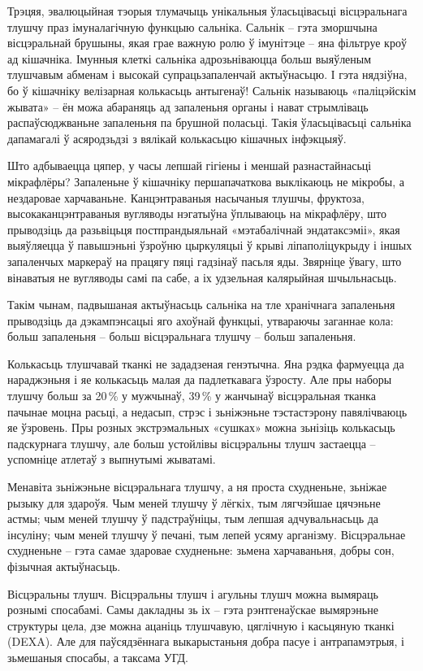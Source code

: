 Трэцяя, эвалюцыйная тэорыя тлумачыць унікальныя ўласьцівасьці вісцэральнага тлушчу праз імуналагічную функцыю сальніка. Сальнік – гэта зморшчына вісцэральнай брушыны, якая грае важную ролю ў імунітэце – яна фільтруе кроў ад кішачніка. Імунныя клеткі сальніка адрозьніваюцца больш выяўленым тлушчавым абменам і высокай супрацьзапаленчай актыўнасьцю. І гэта нядзіўна, бо ў кішачніку велізарная колькасьць антыгенаў! Сальнік называюць «паліцэйскім жывата» – ён можа абараняць ад запаленьня органы і нават стрымліваць распаўсюджваньне запаленьня па брушной поласьці. Такія ўласьцівасьці сальніка дапамагалі ў асяродзьдзі з вялікай колькасьцю кішачных інфэкцыяў.

Што адбываецца цяпер, у часы лепшай гігіены і меншай разнастайнасьці мікрафлёры? Запаленьне ў кішачніку першапачаткова выклікаюць не мікробы, а нездаровае харчаваньне. Канцэнтраваныя насычаныя тлушчы, фруктоза, высокаканцэнтраваныя вугляводы нэгатыўна ўплываюць на мікрафлёру, што прыводзіць да разьвіцьця постпрандыяльнай «мэтабалічнай эндатаксэміі», якая выяўляецца ў павышэньні ўзроўню цыркуляцыі ў крыві ліпаполіцукрыду і іншых запаленчых маркераў на працягу пяці гадзінаў пасьля яды. Звярніце ўвагу, што вінаватыя не вугляводы самі па сабе, а іх удзельная калярыйная шчыльнасьць.

Такім чынам, падвышаная актыўнасьць сальніка на тле хранічнага запаленьня прыводзіць да дэкампэнсацыі яго ахоўнай функцыі, утвараючы заганнае кола: больш запаленьня – больш вісцэральнага тлушчу – больш запаленьня.

Колькасьць тлушчавай тканкі не зададзеная генэтычна. Яна рэдка фармуецца да нараджэньня і яе колькасьць малая да падлеткавага ўзросту. Але пры наборы тлушчу больш за 20\,\% у мужчынаў, 39\,\% у жанчынаў вісцэральная тканка пачынае моцна расьці, а недасып, стрэс і зьніжэньне тэстастэрону павялічваюць яе ўзровень. Пры розных экстрэмальных «сушках» можна зьнізіць колькасьць падскурнага тлушчу, але больш устойлівы вісцэральны тлушч застаецца – успомніце атлетаў з выпнутымі жыватамі.

Менавіта зьніжэньне вісцэральнага тлушчу, а ня проста схудненьне, зьніжае рызыку для здароўя. Чым меней тлушчу ў лёгкіх, тым лягчэйшае цячэньне астмы; чым меней тлушчу ў падстраўніцы, тым лепшая адчувальнасьць да інсуліну; чым меней тлушчу ў печані, тым лепей усяму арганізму. Вісцэральнае схудненьне – гэта самае здаровае схудненьне: зьмена харчаваньня, добры сон, фізычная актыўнасьць.

Вісцэральны тлушч. Вісцэральны тлушч і агульны тлушч можна вымяраць рознымі спосабамі. Самы дакладны зь іх – гэта рэнтгенаўскае вымярэньне структуры цела, дзе можна ацаніць тлушчавую, цяглічную і касьцяную тканкі (DEXA). Але для паўсядзённага выкарыстаньня добра пасуе і антрапамэтрыя, і зьмешаныя спосабы, а таксама УГД.

